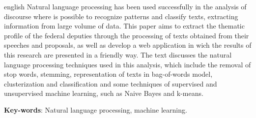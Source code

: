 \begin{resumo}[Abstract]
 \begin{otherlanguage*}{english}
   Natural language processing has been used successfully in the analysis of discourse where is possible to recognize patterns and classify texts, extracting information from large volume of data. This paper aims to extract the thematic profile of the federal deputies through the processing of texts obtained from their speeches and proposals, as well as develop a web application in wich the results of this research are presented in a friendly way. The text discusses the natural language processing techniques used in this analysis, which include the removal of stop words, stemming, representation of texts in bag-of-words model, clusterization and classification and some techniques of supervised and unsupervised machine learning, such as Naive Bayes and k-means.

   \vspace{\onelineskip}

   \noindent
   \textbf{Key-words}: Natural language processing, machine learning.
 \end{otherlanguage*}
\end{resumo}
